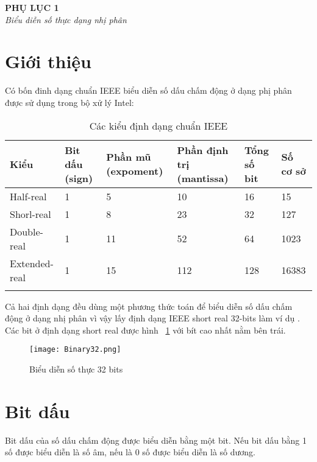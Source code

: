 \begin{center}
	\begin{huge}
			\textbf{PHỤ LỤC 1}\\
			\textit{Biểu diễn số thực dạng nhị phân}\\
	\end{huge}
\end{center}

\section*{Giới thiệu}
Có bốn đinh dạng chuẩn IEEE biểu diễn số dấu chấm động ở dạng phị phân được sử dụng trong bộ xử lý Intel:
\begin{longtable}{|l|m{2cm}|m{3cm}|m{3cm}|l|l|}
	\hline
		Kiểu & Bit dấu (sign) & Phần mũ (expoment) &Phần định trị (mantissa) & Tổng số bit & Số cơ sở \\
	\hline
	\hline
			Half-real	&1&	5 &	10	&16	 &	15\\
	\hline
			Shorl-real &	1	& 8	 & 23	 & 32	&	127\\
	\hline
			Double-real &1 &	11 &52 &	64	&	1023\\
	\hline
		Extended-real&	1 &	15 &	112 &	128 &	16383\\
	\hline
	\caption{Các kiểu định dạng chuẩn IEEE}
\end{longtable}

Cả hai định dạng đều dùng một phương thức toán để biểu diễn số dấu chấm động ở dạng nhị phân vì vậy lấy định dạng IEEE short real 32-bits làm ví dụ . Các bit ở định dạng short real được hình ~\ref{fig:Bianry32} với bít cao nhất nằm bên trái.

		\begin{center}
			\begin{figure}[htp]
				\begin{center}
					\texttt{[image: Binary32.png]}
				\end{center}
				\caption{Biểu diễn số thực 32 bits}	
					\label{fig:Bianry32}		
			\end{figure}
		\end{center}			

\section*{Bit dấu}
 Bit dấu của số dấu chấm động được biểu diễn bằng một bit. Nếu bit dấu bằng 1 số được biểu diễn là số âm, nếu là 0 số được biểu diễn là số dương. \\
 
